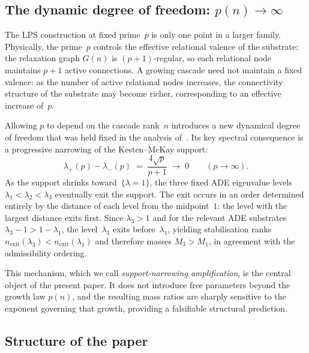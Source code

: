 \documentclass[11pt,a4paper]{article}
\newcommand{\nexit}{n_{\mathrm{exit}}}
\begin{document}
    \subsection{The dynamic degree of freedom: $p(n)\to\infty$}
      \label{subsec:dynamic-dof}

      The LPS construction at fixed prime~$p$ is only one point in a larger family.
      Physically, the prime~$p$ controls the effective relational valence of the substrate:
      the relaxation graph $G(n)$ is $(p+1)$-regular, so each relational node maintains
      $p+1$ active connections.
      A growing cascade need not maintain a fixed valence: as the number of active
      relational nodes increases, the connectivity structure of the substrate may become
      richer, corresponding to an effective increase of~$p$.

      Allowing $p$ to depend on the cascade rank~$n$ introduces a new dynamical degree
      of freedom that was held fixed in the analysis of~\cite{Beau2026a5}.
      Its key spectral consequence is a progressive narrowing of the Kesten--McKay support:
      \begin{equation}
        \lambda_{+}(p) - \lambda_{-}(p)
        \;=\; \frac{4\sqrt{p}}{p+1}
        \;\longrightarrow\; 0
        \qquad (p\to\infty).
      \end{equation}
      As the support shrinks toward~$\{\lambda=1\}$, the three fixed ADE eigenvalue levels
      $\lambda_{1}<\lambda_{2}<\lambda_{3}$ eventually exit the support.
      The exit occurs in an order determined entirely by the distance of each level from
      the midpoint~$1$: the level with the largest distance exits first.
      Since $\lambda_{3}>1$ and for the relevant ADE substrates $\lambda_{3}-1 > 1-\lambda_{1}$,
      the level~$\lambda_{3}$ exits before~$\lambda_{1}$,
      yielding stabilisation ranks $\nexit(\lambda_{3}) < \nexit(\lambda_{1})$
      and therefore masses $M_{3}>M_{1}$,
      in agreement with the admissibility ordering.

      This mechanism, which we call \emph{support-narrowing amplification}, is the
      central object of the present paper.
      It does not introduce free parameters beyond the growth law $p(n)$,
      and the resulting mass ratios are sharply sensitive to the exponent governing
      that growth, providing a falsifiable structural prediction.

    \subsection{Structure of the paper}
      \label{subsec:structure}
\end{document}
